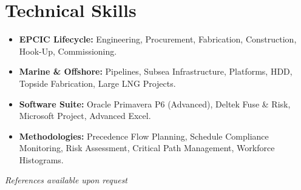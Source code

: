 \documentclass[11pt,a4paper]{article}
\begin{document}
\section{Technical Skills}
\begin{itemize}[label={\color{awesome-blue}\small\textbullet}, leftmargin=*, itemsep=0pt, parsep=0pt]
    \raggedright
    \item \textbf{EPCIC Lifecycle:} Engineering, Procurement, Fabrication, Construction, Hook-Up, Commissioning.
    \item \textbf{Marine \& Offshore:} Pipelines, Subsea Infrastructure, Platforms, HDD, Topside Fabrication, Large LNG Projects.
    \item \textbf{Software Suite:} Oracle Primavera P6 (Advanced), Deltek Fuse \& Risk, Microsoft Project, Advanced Excel.
    \item \textbf{Methodologies:} Precedence Flow Planning, Schedule Compliance Monitoring, Risk Assessment, Critical Path Management, Workforce Histograms.
\end{itemize}

\vfill
\begin{center}
    \textit{References available upon request}
\end{center}
\end{document}
